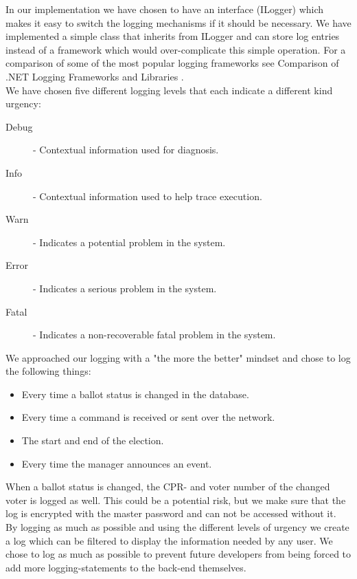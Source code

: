 \documentclass[a4paper]{report}
\begin{document}
In our implementation we have chosen to have an interface (ILogger) which makes it easy to switch the logging mechanisms if it should be necessary. We have implemented a simple class that inherits from ILogger and can store log entries instead of a framework which would over-complicate this simple operation. For a comparison of some of the most popular logging frameworks see Comparison of .NET Logging Frameworks and Libraries \cite{logcomp}. \\

\noindent We have chosen five different logging levels that each indicate a different kind urgency:
\begin{description}
\item [Debug] - Contextual information used for diagnosis.
\item [Info] - Contextual information used to help trace execution.
\item [Warn] - Indicates a potential problem in the system.
\item [Error] - Indicates a serious problem in the system.
\item [Fatal] - Indicates a non-recoverable fatal problem in the system.
\end{description}

\noindent We approached our logging with a "the more the better" mindset and chose to log the following things:
\begin{itemize}
\item Every time a ballot status is changed in the database.
\item Every time a command is received or sent over the network.
\item The start and end of the election.
\item Every time the manager announces an event.
\end{itemize}

When a ballot status is changed, the CPR- and voter number of the changed voter is logged as well. This could be a potential risk, but we make sure that the log is encrypted with the master password and can not be accessed without it. \\

By logging as much as possible and using the different levels of urgency we create a log which can be filtered to display the information needed by any user. We chose to log as much as possible to prevent future developers from being forced to add more logging-statements to the back-end themselves. 
\end{document}
